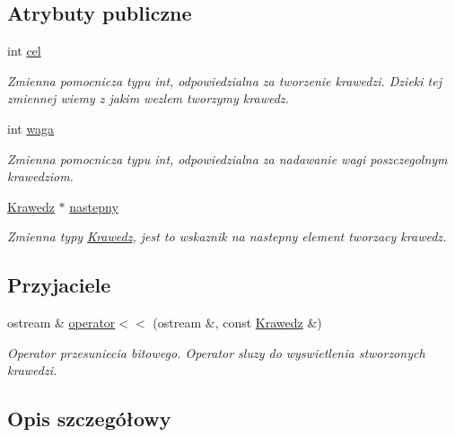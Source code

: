 \subsection*{\-Atrybuty publiczne}
\begin{DoxyCompactItemize}
\item 
int \hyperlink{class_graf_1_1_wezel_1_1_krawedz_ae219f30db7c3761bcdcbba20d0e4023a}{cel}
\begin{DoxyCompactList}\small\item\em \-Zmienna pomocnicza typu int, odpowiedzialna za tworzenie krawedzi. \-Dzieki tej zmiennej wiemy z jakim wezlem tworzymy krawedz. \end{DoxyCompactList}\item 
int \hyperlink{class_graf_1_1_wezel_1_1_krawedz_ab900fa366cffd467955f87c504c32794}{waga}
\begin{DoxyCompactList}\small\item\em \-Zmienna pomocnicza typu int, odpowiedzialna za nadawanie wagi poszczegolnym krawedziom. \end{DoxyCompactList}\item 
\hyperlink{class_graf_1_1_wezel_1_1_krawedz}{\-Krawedz} $\ast$ \hyperlink{class_graf_1_1_wezel_1_1_krawedz_ab86634f5084e5326fb57ae1a01a2e89d}{nastepny}
\begin{DoxyCompactList}\small\item\em \-Zmienna typy \hyperlink{class_graf_1_1_wezel_1_1_krawedz}{\-Krawedz}, jest to wskaznik na nastepny element tworzacy krawedz. \end{DoxyCompactList}\end{DoxyCompactItemize}
\subsection*{\-Przyjaciele}
\begin{DoxyCompactItemize}
\item 
ostream \& \hyperlink{class_graf_1_1_wezel_1_1_krawedz_ab9d7590ad75bb8785cfb2b1c00158be2}{operator$<$$<$} (ostream \&, const \hyperlink{class_graf_1_1_wezel_1_1_krawedz}{\-Krawedz} \&)
\begin{DoxyCompactList}\small\item\em \-Operator przesuniecia bitowego. \-Operator sluzy do wyswietlenia stworzonych krawedzi. \end{DoxyCompactList}\end{DoxyCompactItemize}


\subsection{\-Opis szczegółowy}


